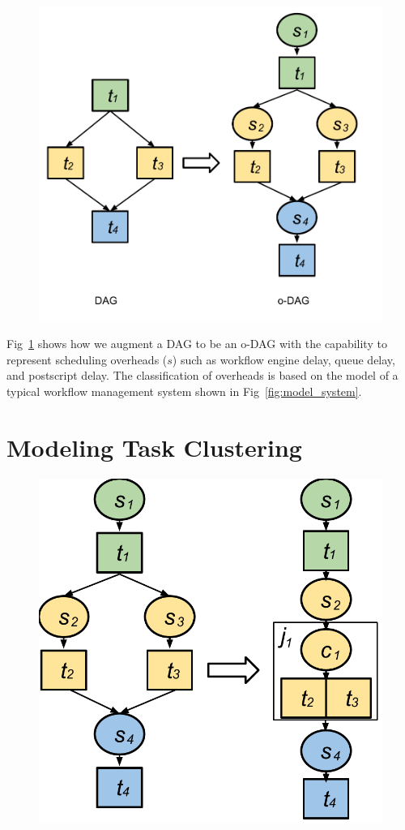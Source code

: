 


\begin{figure}[h!]
\includegraphics[width=0.6\linewidth]{figures/model/odag.pdf}
\centering
  \label{fig:model_odag}
\end{figure}

Fig~\ref{fig:model_odag} shows how we augment a DAG to be an o-DAG with the capability to represent scheduling overheads ($s$) such as workflow engine delay, queue delay, and postscript delay. The classification of overheads is based on the model of a typical workflow management system shown in Fig~\ref{fig:model_system}. 


\section{Modeling Task Clustering}

\begin{figure}[h!]
\centering
 \includegraphics[width=0.5\linewidth]{figures/introduction/hc.pdf}
  \label{fig:intro_hc}
\end{figure}


